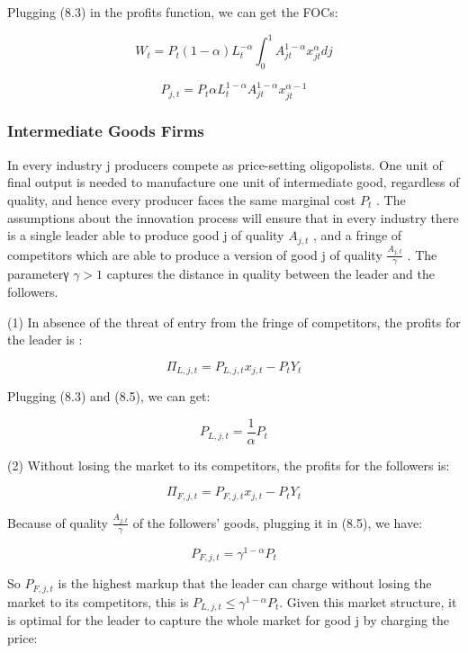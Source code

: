 \documentclass[cn,10pt,math=newtx,citestyle=gb7714-2015,bibstyle=gb7714-2015]{elegantbook}
\begin{document}
{{	Plugging (8.3) in the profits function, we can get the FOCs:
	
	\begin{equation}
		W_t = P_t (1-\alpha)L_{t}^{-\alpha} \int_{0}^{1} A_{j t}^{1-\alpha} x_{j t}^{\alpha} d j
	\end{equation}
		
		\begin{equation}
		P_{j,t} = P_t \alpha L_{t}^{1-\alpha} A_{j t}^{1-\alpha} x_{j t}^{\alpha-1}
	\end{equation}
		
	\subsubsection{Intermediate Goods Firms}
	
	In every industry j producers compete as price-setting oligopolists. One unit of final output is needed to manufacture one unit of intermediate good, regardless of quality, and hence every producer faces the same marginal cost $P_t$ . The assumptions about the innovation process will ensure that in every industry there is a single leader able to produce good j of quality $A_{j,t}$ , and a fringe of competitors which are able to produce a version of good j of quality $\frac{A_{j,t}}{\gamma}$ . The parameterγ $\gamma>1$ captures the distance in quality between the leader and the followers.
	
	(1) In absence of the threat of entry from the fringe of competitors, the profits for the leader is :
	
	$$\Pi_{L,j,t} = P_{L,j,t} x_{j,t} - P_t Y_t$$
	
	Plugging (8.3) and (8.5), we can get:
	
	\begin{equation}
		P_{L,j,t} = \frac{1}{\alpha} P_t
	\end{equation}
	
	(2) Without losing the market to its competitors, the profits for the followers is:
	
		$$\Pi_{F,j,t} = P_{F,j,t} x_{j,t} - P_t Y_t$$
	
	Because of  quality $\frac{A_{j,t}}{\gamma}$ of the followers' goods, plugging it in (8.5), we have:
	
		\begin{equation}
		P_{F,j,t} = \gamma^{1-\alpha}P_t
	\end{equation}
	
	So $P_{F,j,t}$ is the highest markup that the leader can charge without losing the market to its competitors, this is $P_{L,j,t}  \le \gamma^{1-\alpha}P_t$. Given this market structure, it is optimal for the leader to capture the whole market for good j by charging the price:
	
}}
\end{document}
